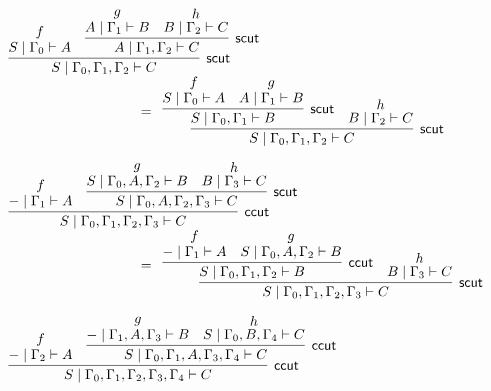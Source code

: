\documentclass[sn-mathphys-num]{sn-jnl}%
\newcommand{\GG}{\Gamma}
\newcommand{\vd}{\vdash}
\newcommand{\mf}[1]{\mathsf{#1}}
\theoremstyle{thmstyleone}%
\theoremstyle{thmstyletwo}%
\theoremstyle{thmstylethree}%
\begin{document}
\begin{figure}
  \begin{displaymath}
    \begin{array}{l}
      \begin{array}{c}
        \infer[\mf{scut}]{S \mid \GG_0 , \GG_1 , \GG_2 \vd C}{
        \deduce{S \mid \GG_0 \vd A}{f}
        &
        \infer[\mf{scut}]{A \mid \GG_1 , \GG_2 \vd C}{
        \deduce{A \mid \GG_1 \vd B}{g}
        &
        \deduce{B \mid \GG_2 \vd C}{h}
        }
        }
      \end{array}
      \\[10pt]
      \qquad \qquad \qquad \qquad \qquad  =
      \begin{array}{c}
        \infer[\mf{scut}]{S \mid \GG_0 , \GG_1 , \GG_2 \vd C}{
        \infer[\mf{scut}]{S \mid \GG_0 , \GG_1 \vd B}{
        \deduce{S \mid \GG_0 \vd A}{f}
        &
        \deduce{A \mid \GG_1 \vd B}{g}
        }
        &
        \deduce{B \mid \GG_2 \vd C}{h}
        }
      \end{array}
      \\[30pt]
      \begin{array}{c}
        \infer[\mf{ccut}]{S \mid \GG_0 , \GG_1 , \GG_2 , \GG_3 \vd C}{
        \deduce{{-} \mid \GG_1 \vd A}{f}
        &
        \infer[\mf{scut}]{S \mid \GG_0 , A , \GG_2 , \GG_3 \vd C}{
        \deduce{S \mid \GG_0 , A , \GG_2 \vd B}{g}
        &
        \deduce{B \mid \GG_3 \vd C}{h}
        }
        }
      \end{array}
      \\[10pt]
      \qquad \qquad \qquad \qquad \qquad  =
      \begin{array}{c}
        \infer[\mf{scut}]{S \mid \GG_0 , \GG_1 , \GG_2 , \GG_3 \vd C}{
        \infer[\mf{ccut}]{S \mid \GG_0 , \GG_1 , \GG_2 \vd B}{
        \deduce{{-} \mid \GG_1 \vd A}{f}
        &
        \deduce{S \mid \GG_0 , A , \GG_2 \vd B}{g}
        }
        &
        \deduce{B \mid \GG_3 \vd C}{h}
        }
      \end{array}
      \\[30pt]
      \begin{array}{c}
        \infer[\mf{ccut}]{S \mid \GG_0 , \GG_1 , \GG_2 , \GG_3 , \GG_4 \vd C}{
        \deduce{{-} \mid \GG_2 \vd A}{f}
        &
        \infer[\mf{ccut}]{S \mid \GG_0 , \GG_1 , A , \GG_3 , \GG_4 \vd C}{
        \deduce{{-} \mid \GG_1 , A , \GG_3 \vd B}{g}
        &
        \deduce{S \mid \GG_0 , B , \GG_4 \vd C}{h}
        }
        }

\end{array}
\end{array}
\end{displaymath}
\end{figure}
\end{document}
